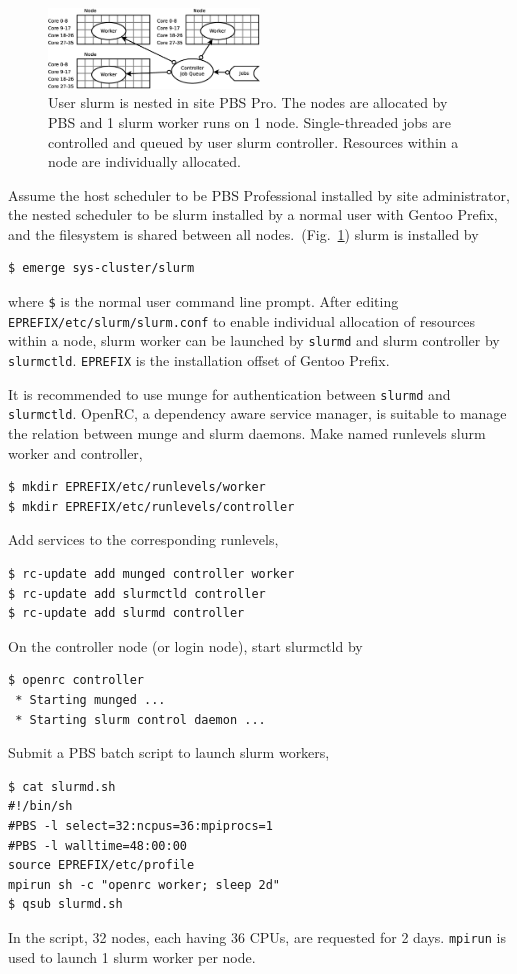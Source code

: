 \documentclass[a4paper,conference]{IEEEtran}
\begin{document}
\begin{figure}[htb]
  \centering
  \includegraphics[width=0.5\textwidth]{node-slurm.eps}
  \caption{User slurm is nested in site PBS Pro.  The nodes are
    allocated by PBS and 1 slurm worker runs on 1 node.
    Single-threaded jobs are controlled and queued by user slurm
    controller.  Resources within a node are individually allocated.}
  \label{fig:slurm}
\end{figure}

Assume the host scheduler to be PBS Professional installed by site
administrator, the nested scheduler to be slurm installed by a normal
user with Gentoo Prefix, and the filesystem is shared between all
nodes.~(Fig.~\ref{fig:slurm}) slurm is installed by
\begin{verbatim}
$ emerge sys-cluster/slurm
\end{verbatim}
where \texttt{\$} is the normal user command line prompt.  After editing
\texttt{EPREFIX/etc/slurm/slurm.conf} to enable individual
allocation of resources within a node, slurm worker
can be launched by \texttt{slurmd} and slurm controller by
\texttt{slurmctld}.  \texttt{EPREFIX} is the installation offset of
Gentoo Prefix.

It is recommended to use munge for authentication between
\texttt{slurmd} and \texttt{slurmctld}.  OpenRC, a dependency aware
service manager, is suitable to manage the relation between munge and
slurm daemons.  Make named runlevels slurm worker and controller,
\begin{verbatim}
$ mkdir EPREFIX/etc/runlevels/worker
$ mkdir EPREFIX/etc/runlevels/controller
\end{verbatim}
Add services to the corresponding runlevels,
\begin{verbatim}
$ rc-update add munged controller worker
$ rc-update add slurmctld controller
$ rc-update add slurmd controller
\end{verbatim}
On the controller node (or login node), start slurmctld by
\begin{verbatim}
$ openrc controller
 * Starting munged ...
 * Starting slurm control daemon ...
\end{verbatim}
Submit a PBS batch script to launch slurm workers,
\begin{verbatim}
$ cat slurmd.sh
#!/bin/sh
#PBS -l select=32:ncpus=36:mpiprocs=1
#PBS -l walltime=48:00:00
source EPREFIX/etc/profile
mpirun sh -c "openrc worker; sleep 2d"
$ qsub slurmd.sh
\end{verbatim}
In the script, 32 nodes, each having 36 CPUs, are requested for 2
days. \texttt{mpirun} is used to launch 1 slurm worker per node.
\end{document}
